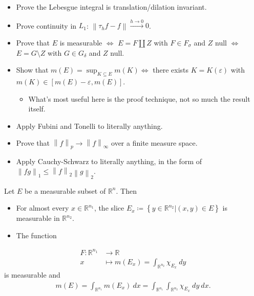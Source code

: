 \begin{exercise}[?]

\envlist

\begin{itemize}
\tightlist
\item
  Prove the Lebesgue integral is translation/dilation invariant.
\item
  Prove continuity in \(L_1\):
  \({\left\lVert {\tau_hf - f} \right\rVert}\overset{h\to 0}\longrightarrow 0\).
\item
  Prove that \(E\) is measurable \(\iff\) \(E = F {\textstyle\coprod}Z\)
  with \(F\in F_\sigma\) and \(Z\) null \(\iff\) \(E = G\setminus Z\)
  with \(G\in G_\delta\) and \(Z\) null.
\item
  Show that \(m(E) = \sup_{K \subseteq E}m(K) \iff\) there exists
  \(K = K({\varepsilon})\) with
  \(m(K) \in [m(E) - {\varepsilon}, m(E)]\).

  \begin{itemize}
  \tightlist
  \item
    What's most useful here is the proof technique, not so much the
    result itself.
  \end{itemize}
\item
  Apply Fubini and Tonelli to literally anything.
\item
  Prove that
  \({\left\lVert {f} \right\rVert}_p\to {\left\lVert {f} \right\rVert}_\infty\)
  over a finite measure space.
\item
  Apply Cauchy-Schwarz to literally anything, in the form of
  \({\left\lVert {fg} \right\rVert}_1 \leq {\left\lVert {f} \right\rVert}_2 {\left\lVert {g} \right\rVert}_2\).
\end{itemize}

\end{exercise}

\begin{proposition}

Let \(E\) be a measurable subset of \({\mathbb{R}}^n\). Then

\begin{itemize}
\tightlist
\item
  For almost every \(x\in {\mathbb{R}}^{n_1}\), the slice
  \(E_x \coloneqq\left\{{y \in {\mathbb{R}}^{n_2} \mathrel{\Big|}(x,y) \in E}\right\}\)
  is measurable in \({\mathbb{R}}^{n_2}\).
\item
  The function
\end{itemize}

\begin{align*}
F: {\mathbb{R}}^{n_1} &\to {\mathbb{R}}\\
x &\mapsto m(E_x) = \int_{{\mathbb{R}}^{n_2}} \chi_{E_x} ~dy
\end{align*}
is measurable and
\begin{align*}
m(E) = \int_{{\mathbb{R}}^{n_1}} m(E_x) ~dx 
= \int_{{\mathbb{R}}^{n_1}} \int_{{\mathbb{R}}^{n_2}} \chi_{E_x} ~dy ~dx
.\end{align*}

\end{proposition}

